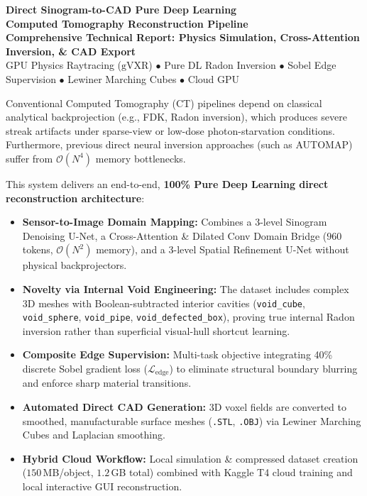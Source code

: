 \documentclass[10pt,a4paper]{article}
\begin{document}
\begin{center}
    {\Large\bfseries\color{navyblue} Direct Sinogram-to-CAD Pure Deep Learning}\\[2pt]
    {\Large\bfseries\color{navyblue} Computed Tomography Reconstruction Pipeline}\\[5pt]
    {\normalsize\bfseries\color{darkgray} Comprehensive Technical Report: Physics Simulation, Cross-Attention Inversion, \& CAD Export}\\[3pt]
    {\footnotesize\color{gray} GPU Physics Raytracing ($\text{gVXR}$) $\bullet$ Pure DL Radon Inversion $\bullet$ Sobel Edge Supervision $\bullet$ Lewiner Marching Cubes $\bullet$ Cloud GPU}
\end{center}

\vspace{-4pt}
\begin{tcolorbox}[title=\textbf{Executive Summary \& Fundamental Innovations}, colback=white, colframe=navyblue]
\small
Conventional Computed Tomography (CT) pipelines depend on classical analytical backprojection (e.g., FDK, Radon inversion), which produces severe streak artifacts under sparse-view or low-dose photon-starvation conditions. Furthermore, previous direct neural inversion approaches (such as AUTOMAP) suffer from $\mathcal{O}(N^4)$ memory bottlenecks.

This system delivers an end-to-end, \textbf{100\% Pure Deep Learning direct reconstruction architecture}:
\begin{itemize}[leftmargin=*,noitemsep]
    \item \textbf{Sensor-to-Image Domain Mapping:} Combines a 3-level Sinogram Denoising U-Net, a Cross-Attention \& Dilated Conv Domain Bridge ($960$ tokens, $\mathcal{O}(N^2)$ memory), and a 3-level Spatial Refinement U-Net without physical backprojectors.
    \item \textbf{Novelty via Internal Void Engineering:} The dataset includes complex 3D meshes with Boolean-subtracted interior cavities (\texttt{void\_cube}, \texttt{void\_sphere}, \texttt{void\_pipe}, \texttt{void\_defected\_box}), proving true internal Radon inversion rather than superficial visual-hull shortcut learning.
    \item \textbf{Composite Edge Supervision:} Multi-task objective integrating 40\% discrete Sobel gradient loss ($\mathcal{L}_{\text{edge}}$) to eliminate structural boundary blurring and enforce sharp material transitions.
    \item \textbf{Automated Direct CAD Generation:} 3D voxel fields are converted to smoothed, manufacturable surface meshes (\texttt{.STL}, \texttt{.OBJ}) via Lewiner Marching Cubes and Laplacian smoothing.
    \item \textbf{Hybrid Cloud Workflow:} Local simulation \& compressed dataset creation ($150$\,MB/object, $1.2$\,GB total) combined with Kaggle T4 cloud training and local interactive GUI reconstruction.
\end{itemize}
\end{tcolorbox}
\end{document}
